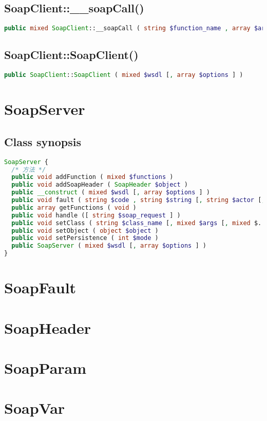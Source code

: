 \section{SoapClient::\_\_soapCall()}

\begin{lstlisting}[language=PHP]
public mixed SoapClient::__soapCall ( string $function_name , array $arguments [, array $options [, mixed $input_headers [, array &$output_headers ]]] )
\end{lstlisting}

\section{SoapClient::SoapClient()}


\begin{lstlisting}[language=PHP]
public SoapClient::SoapClient ( mixed $wsdl [, array $options ] )
\end{lstlisting}










\chapter{SoapServer}


\section{Class synopsis}


\begin{lstlisting}[language=PHP]
SoapServer {
  /* 方法 */
  public void addFunction ( mixed $functions )
  public void addSoapHeader ( SoapHeader $object )
  public __construct ( mixed $wsdl [, array $options ] )
  public void fault ( string $code , string $string [, string $actor [, string $details [, string $name ]]] )
  public array getFunctions ( void )
  public void handle ([ string $soap_request ] )
  public void setClass ( string $class_name [, mixed $args [, mixed $... ]] )
  public void setObject ( object $object )
  public void setPersistence ( int $mode )
  public SoapServer ( mixed $wsdl [, array $options ] )
}
\end{lstlisting}


\chapter{SoapFault}


\chapter{SoapHeader}


\chapter{SoapParam}


\chapter{SoapVar}